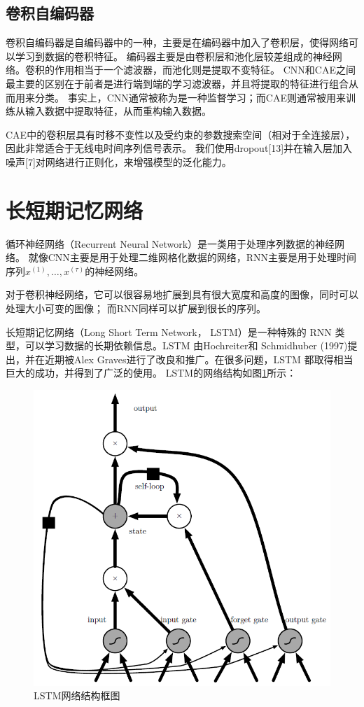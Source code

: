 \subsection{卷积自编码器}
卷积自编码器是自编码器中的一种，主要是在编码器中加入了卷积层，使得网络可以学习到数据的卷积特征。
编码器主要是由卷积层和池化层较差组成的神经网络。卷积的作用相当于一个滤波器，而池化则是提取不变特征。
CNN和CAE之间最主要的区别在于前者是进行端到端的学习滤波器，并且将提取的特征进行组合从而用来分类。
事实上，CNN通常被称为是一种监督学习；而CAE则通常被用来训练从输入数据中提取特征，从而重构输入数据。\par

CAE中的卷积层具有时移不变性以及受约束的参数搜索空间（相对于全连接层），因此非常适合于无线电时间序列信号表示。
我们使用dropout[13]并在输入层加入噪声[7]对网络进行正则化，来增强模型的泛化能力。\par

\section{长短期记忆网络}

循环神经网络（Recurrent Neural Network）是一类用于处理序列数据的神经网络。
就像CNN主要是用于处理二维网格化数据的网络，RNN主要是用于处理时间序列$x^{(1)}, \dots, x^{(\tau)}$的神经网络。

对于卷积神经网络，它可以很容易地扩展到具有很大宽度和高度的图像，同时可以处理大小可变的图像；
而RNN同样可以扩展到很长的序列。\par
长短期记忆网络（Long Short Term Network， LSTM）是一种特殊的 RNN 类型，可以学习数据的长期依赖信息。LSTM 由Hochreiter和 Schmidhuber (1997)提出，并在近期被Alex Graves进行了改良和推广。在很多问题，LSTM 都取得相当巨大的成功，并得到了广泛的使用。
LSTM的网络结构如图\ref{sec:fig_2_6}所示：\par
\begin{figure}[!h]
	\centering
	\includegraphics[scale=0.5]{figures/chapter_2/fig_2_6_1.png}
	\caption{LSTM网络结构框图}\label{sec:fig_2_6}
\end{figure}

